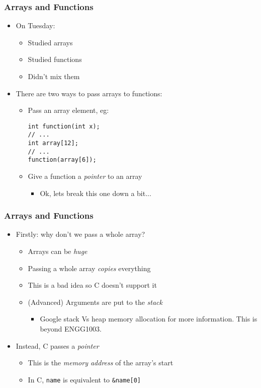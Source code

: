 \documentclass[14pt]{beamer}
\begin{document}
\begin{frame}[fragile]
\frametitle{Arrays and Functions}
\begin{itemize}
\item On Tuesday:
	\begin{itemize}
		\item Studied arrays
		\item Studied functions
		\item Didn't mix them
	\end{itemize}
\pause
\item There are two ways to pass arrays to functions:
\vspace{-5mm}
	\begin{itemize}
	\pause
		\item Pass an array element, eg:
		\begin{lstlisting}[style=CStyle]
int function(int x);
// ...
int array[12];
// ...
function(array[6]);
\end{lstlisting}
\pause
		\item Give a function a \textit{pointer} to an array
			\begin{itemize}
				\item Ok, lets break this one down a bit...
			\end{itemize}
	\end{itemize}
\end{itemize}
\end{frame}

\begin{frame}
\frametitle{Arrays and Functions}
\begin{itemize}
\item Firstly: why don't we pass a whole array?
\pause
	\begin{itemize}
		\item Arrays can be \textit{huge}
		\item Passing a whole array \textit{copies} everything
		\item This is a bad idea so C doesn't support it
		\item (Advanced) Arguments are put to the \textit{stack}
			\begin{itemize}
				\item Google stack Vs heap memory allocation for more information. This is beyond ENGG1003.
			\end{itemize}
	\end{itemize}
\pause
\item Instead, C passes a \textit{pointer}
	\begin{itemize}
		\item This is the \textit{memory address} of the array's start
		\pause
		\item In C, \texttt{name} is equivalent to \texttt{\&name[0]}
	\end{itemize}
\end{itemize}
\end{frame}
\end{document}

